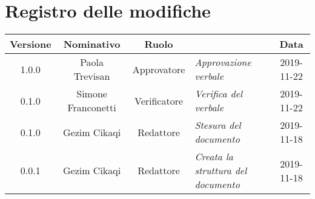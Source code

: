 \section*{Registro delle modifiche}
\renewcommand{\arraystretch}{1.8}
  
  \begin{longtable}{|c|c|c|p{3.8cm}|c|}
    \hline
    
    \rowcolor{header}
    \textbf{Versione} & \textbf{Nominativo} & \textbf{Ruolo} & \centering{\textbf{Descrizione}} & \textbf{Data}\\
    
    \hline
    
    1.0.0 & Paola Trevisan & Approvatore & \small{\textit{Approvazione verbale}} & 2019-11-22\\
    0.1.0 & Simone Franconetti & Verificatore & \small{\textit{Verifica del verbale }} & 2019-11-22\\
    0.1.0 & Gezim Cikaqi & Redattore & \small{\textit{Stesura del documento}} & 2019-11-18\\
    0.0.1 & Gezim Cikaqi & Redattore & \small{\textit{Creata la struttura del documento}} & 2019-11-18\\
    
    \hline
  \end{longtable}